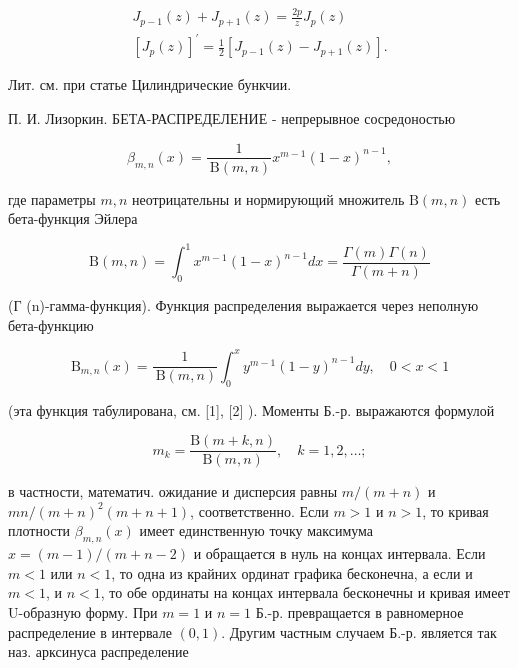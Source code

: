 \documentclass[10pt]{article}
\begin{document}
\[

\begin{gathered}

J_{p-1}(z)+J_{p+1}(z)=\frac{2 p}{z} J_{p}(z) \\

{\left[J_{p}(z)\right]^{\prime}=\frac{1}{2}\left[J_{p-1}(z)-J_{p+1}(z)\right] .}

\end{gathered}

\]



Лит. см. при статье Цилиндрические бункчии.



П. И. Лизоркин. БЕТА-РАСПРЕДЕЛЕНИЕ - непрерывное сосредоностью



\[

\beta_{m, n}(x)=\frac{1}{\mathrm{~B}(m, n)} x^{m-1}(1-x)^{n-1},

\]



где параметры $m, n$ неотрицательны и нормирующий множитель $\mathrm{B}(m, n)$ есть бета-функция Эйлера



\[

\mathrm{B}(m, n)=\int_{0}^{1} x^{m-1}(1-x)^{n-1} d x=\frac{\Gamma(m) \Gamma(n)}{\Gamma(m+n)}

\]



(Г (n)-гамма-функция). Функция распределения выражается через неполную бета-функцию



\[

\mathrm{B}_{m, n}(x)=\frac{1}{\mathrm{~B}(m, n)} \int_{0}^{x} y^{m-1}(1-y)^{n-1} d y, \quad 0<x<1

\]



(эта функция табулирована, см. [1], [2] ). Моменты Б.-р. выражаются формулой



\[

m_{k}=\frac{\mathrm{B}(m+k, n)}{\mathrm{B}(m, n)}, \quad k=1,2, \ldots ;

\]



в частности, математич. ожидание и дисперсия равны $m /(m+n)$ и $m n /(m+n)^{2}(m+n+1)$, соответственно. Если $m>1$ и $n>1$, то кривая плотности $\beta_{m, n}(x)$ имеет единственную точку максимума $x=(m-1) /(m+n-2)$ и обращается в нуль на концах интервала. Если $m<1$ или $n<1$, то одна из крайних ординат графика бесконечна, а если и $m<1$, и $n<1$, то обе ординаты на концах интервала бесконечны и кривая имеет U-образную форму. При $m=1$ и $n=1$ Б.-р. превращается в равномерное распределение в интервале $(0,1)$. Другим частным случаем Б.-р. является так наз. арксинуса распределение
\end{document}
